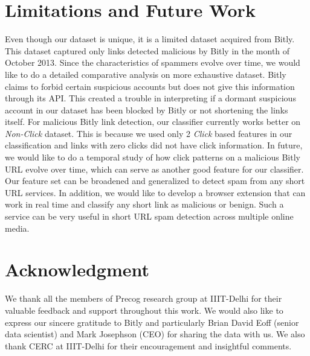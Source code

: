 \documentclass[conference]{IEEEtran}
\begin{document}
\section{Limitations and Future Work}
\vspace{4pt}
Even though our dataset is unique, it is a limited dataset acquired from Bitly. This dataset captured only links detected malicious by Bitly in the month of October 2013. Since the characteristics of spammers evolve over time, we would like to do a detailed comparative analysis on more exhaustive dataset. Bitly claims to forbid certain suspicious accounts but does not give this information through its API. This created a trouble in interpreting if a dormant suspicious account in our dataset has been blocked by Bitly or not shortening the links itself. 
 For malicious Bitly link detection, our classifier currently works better on \textit{Non-Click} dataset. This is because we used only 2 \textit{Click} based features in our classification and links with zero clicks did not have click information. In future, we would like to do a temporal study of how click patterns on a malicious Bitly URL evolve over time, which can serve as another good feature for our classifier. Our feature set can be broadened and generalized to detect spam from any short URL services. In addition, we would like to develop a browser extension that can work in real time and classify any short link as malicious or benign. Such a service can be very useful in short URL spam detection across multiple online media.
\section*{Acknowledgment}
\vspace{4pt}
We thank all the members of Precog research group at IIIT-Delhi for their valuable feedback and support throughout this work. We would also like to express our sincere gratitude to Bitly and particularly Brian David Eoff (senior data scientist) and Mark Josephson (CEO) for sharing the data with us. We also thank CERC at IIIT-Delhi for their encouragement and insightful comments.
\end{document}
